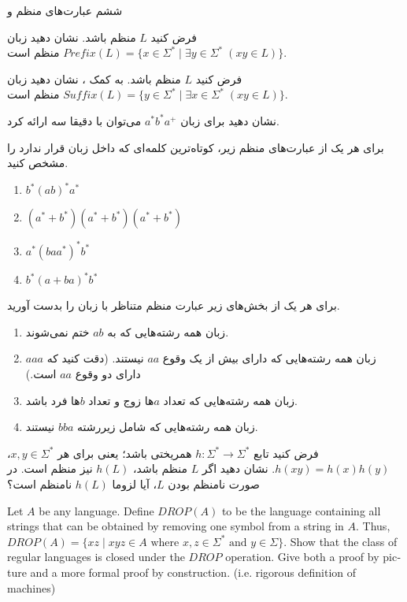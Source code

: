
	
	\MakeTitle
	{ششم}
	{عبارت‌های منظم و }
	\begin{enumerate}
		\item 
		فرض کنید $L$ منظم باشد. نشان دهید زبان
		$Prefix(L) = \{x \in \Sigma^* \;|\; \exists y \in \Sigma^* \; (xy \in L)  \}$
		منظم است. 
		\item 
		فرض کنید $L$ منظم باشد. به کمک ، نشان دهید زبان 
		$Suffix(L) = \{y \in \Sigma^* \;|\; \exists x \in \Sigma^* \; (xy \in L)  \}$
		منظم است. 
		\item 
		نشان دهید برای زبان
		$a^*b^*a^+$
		می‌توان  با دقیقا سه  ارائه کرد.
		\item 
		برای هر یک از عبارت‌های منظم زیر، کوتاه‌ترین کلمه‌ای که داخل زبان قرار ندارد را مشخص کنید.
		\begin{enumerate}
			\item $b^*(ab)^*a^*$
			\item $(a^* + b^*)(a^* + b^*)(a^* + b^*)$
			\item $a^*(baa^*)^*b^*$
			\item $b^*(a+ba)^*b^*$
		\end{enumerate}
	
		\item 
		برای هر یک از بخش‌های زیر عبارت منظم متناظر با زبان را بدست آورید.
		\begin{enumerate}
			\item 
			زبان همه رشته‌هایی که به $ ab $ ختم نمی‌شوند.
			\item 
			زبان همه رشته‌هایی که دارای بیش از یک وقوع $ aa $ نیستند. (دقت کنید که $ aaa $ دارای دو وقوع $ aa $ است.)
			\item 
			زبان همه رشته‌هایی که تعداد $ a $ها زوج و تعداد $ b $ها فرد باشد.
			\item 
			زبان همه رشته‌هایی که شامل زیررشته $ bba $ نیستند.
		\end{enumerate}
		\item
		فرض کنید تابع 
		$h : \Sigma^* \longrightarrow \Sigma^*$
		همریختی باشد؛ یعنی برای هر $x, y \in \Sigma^*$، $h(xy) = h(x)h(y)$. نشان دهید اگر $L$ منظم باشد، 
		$h(L)$ 
		نیز منظم است. در صورت نامنظم بودن $L$، آیا لزوما 
		$h(L)$
		نامنظم است؟
		\begin{latin}
			\item Let $A$ be any language. Define $DROP(A)$ to be the language containing all strings that can be obtained by removing one symbol from a string in $A$. Thus, $DROP(A) = \{xz \;|\; \text{$xyz \in A$ where $x,z \in \Sigma^*$ and $y \in \Sigma$}\}$. Show that the class of regular languages is closed under the $DROP$ operation. Give both a proof by picture and a more formal proof by construction. (i.e. rigorous definition of machines)
			
		\end{latin}
		
	\end{enumerate}	
